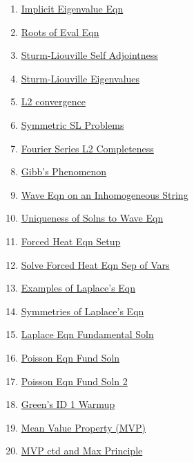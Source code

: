 \documentclass[11pt]{article}
\begin{document}
\begin{multicols}{2}
\begin{enumerate}
		\item  \href{https://mp.weixin.qq.com/s/hmyei7hLb-v3Ahjy87YE8g}{Implicit Eigenvalue Eqn} %
		\item  \href{https://mp.weixin.qq.com/s/Ly2XDitn2l60ObmAMfi98w}{Roots of Eval Eqn} %
		\item  \href{https://mp.weixin.qq.com/s/QKFjpJ39IyQBAHvZUuZk7w}{Sturm-Liouville Self Adjointness} %
		\item  \href{https://mp.weixin.qq.com/s/wNHbCY17ts7dlDYJbDjfbg}{Sturm-Liouville Eigenvalues} %
		\item  \href{https://mp.weixin.qq.com/s/koDhfue_A8NCs4GM7F_tQg}{L2 convergence} %
		\item  \href{https://mp.weixin.qq.com/s/pW_kJbtsPVXNQWQMgnQB6A}{Symmetric SL Problems} %
		\item  \href{https://mp.weixin.qq.com/s/3yxTFluvb4H2A-txS6gKmg}{Fourier Series L2 Completeness} %
		\item  \href{https://mp.weixin.qq.com/s/5SharYQIqVFA7v_8OkwBUQ}{Gibb's Phenomenon} %
		\item  \href{https://mp.weixin.qq.com/s/vLuMG7FAjmlaG--j6UrWsQ}{Wave Eqn on an Inhomogeneous String} %
		\item  \href{https://mp.weixin.qq.com/s/32ASYMsH6JXswo9epCbq0w}{Uniqueness of Solns to Wave Eqn} %
		\item  \href{https://mp.weixin.qq.com/s/qaRbWJns9x82tRKdLbr7VA}{Forced Heat Eqn Setup} %
		\item  \href{https://mp.weixin.qq.com/s/iI1jJmm_QyITnakEmcivjQ}{Solve Forced Heat Eqn Sep of Vars} %
		\item  \href{https://mp.weixin.qq.com/s/yI6kVOOcIeR2v30q3ZRwIQ}{Examples of Laplace's Eqn} %
		\item  \href{https://mp.weixin.qq.com/s/wQ4qutBsKSQmTJdfOQ0OTg}{Symmetries of Laplace's Eqn} %
		\item  \href{https://mp.weixin.qq.com/s/dXbCkZvxYfbA7IdT02_5UA}{Laplace Eqn Fundamental Soln} %
		\item  \href{https://mp.weixin.qq.com/s/Upy0XduX4S84BqkYAJ4tFA}{Poisson Eqn Fund Soln} %
		\item  \href{https://mp.weixin.qq.com/s/jAFOsMd92Cm87pu1tlS2Bg}{Poisson Eqn Fund Soln 2} %
		\item  \href{https://mp.weixin.qq.com/s/TupIMrTJOgdDH1zNvz8VxA}{Green's ID 1 Warmup} %
		\item  \href{https://mp.weixin.qq.com/s/zBulVjaPJXwsacC3tOCO0g}{Mean Value Property (MVP)} %
		\item  \href{https://mp.weixin.qq.com/s/5XzsAetMuhK83YVkJv6H_A}{MVP ctd and Max Principle} %

\end{enumerate}
\end{multicols}
\end{document}
